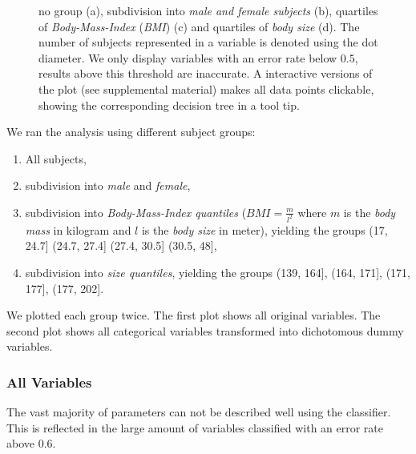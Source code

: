 \documentclass[a4paper,twoside]{style/article}
\begin{document}
\begin{figure}[p!]
{no group (a), subdivision into \emph{male and female subjects} (b), quartiles of \emph{Body-Mass-Index} (\emph{BMI}) (c) and quartiles of \emph{body size} (d).
The number of subjects represented in a variable is denoted using the dot diameter.
We only display variables with an error rate below $0.5$, results above this threshold are inaccurate.
A interactive versions of the plot (see supplemental material) makes all data points clickable, showing the corresponding decision tree in a tool tip.
}
  \label{fig:results}
\end{figure}
We ran the analysis using different subject groups:
\begin{enumerate}
	\item All subjects,
	\item subdivision into \emph{male} and \emph{female},
	\item subdivision into \emph{Body-Mass-Index quantiles} ($BMI = \frac{m}{l^2}$ where $m$ is the \emph{body mass} in kilogram and $l$ is the \emph{body size} in meter), yielding the groups (17, 24.7] (24.7, 27.4] (27.4, 30.5] (30.5, 48],
	\item subdivision into \emph{size quantiles}, yielding the groups (139, 164], (164, 171], (171, 177], (177, 202].
\end{enumerate}
We plotted each group twice.
The first plot shows all original variables.
The second plot shows all categorical variables transformed into dichotomous dummy variables.

\subsubsection{All Variables}
The vast majority of parameters can not be described well using the classifier.
This is reflected in the large amount of variables classified with an error rate above $0.6$.
\end{document}
